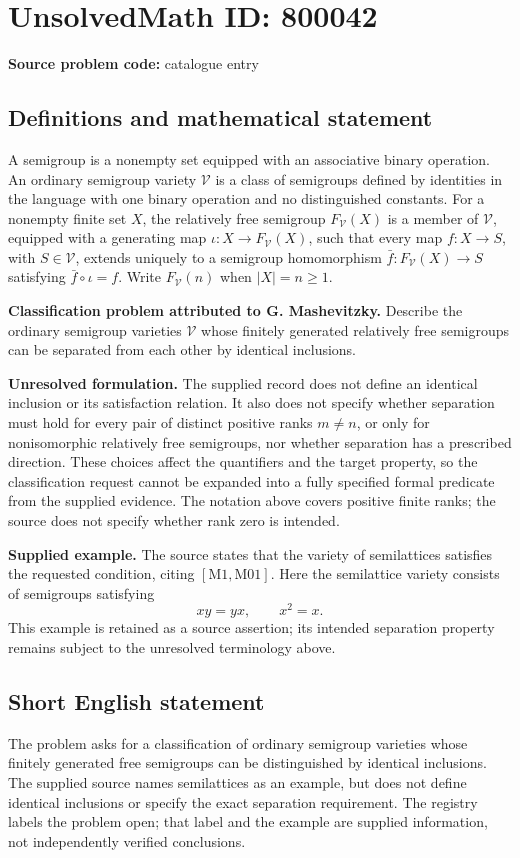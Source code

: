 \documentclass[11pt]{article}
\begin{document}
\section*{UnsolvedMath ID: 800042}
\textbf{Source problem code:} catalogue entry
\subsection{Definitions and mathematical statement}
A semigroup is a nonempty set equipped with an associative binary operation. An ordinary semigroup variety \(\mathcal V\) is a class of semigroups defined by identities in the language with one binary operation and no distinguished constants. For a nonempty finite set \(X\), the relatively free semigroup \(F_{\mathcal V}(X)\) is a member of \(\mathcal V\), equipped with a generating map \(\iota:X\to F_{\mathcal V}(X)\), such that every map \(f:X\to S\), with \(S\in\mathcal V\), extends uniquely to a semigroup homomorphism \(\bar f:F_{\mathcal V}(X)\to S\) satisfying \(\bar f\circ\iota=f\). Write \(F_{\mathcal V}(n)\) when \(|X|=n\geq 1\).

\textbf{Classification problem attributed to G. Mashevitzky.} Describe the ordinary semigroup varieties \(\mathcal V\) whose finitely generated relatively free semigroups can be separated from each other by identical inclusions.

\textbf{Unresolved formulation.} The supplied record does not define an identical inclusion or its satisfaction relation. It also does not specify whether separation must hold for every pair of distinct positive ranks \(m\neq n\), or only for nonisomorphic relatively free semigroups, nor whether separation has a prescribed direction. These choices affect the quantifiers and the target property, so the classification request cannot be expanded into a fully specified formal predicate from the supplied evidence. The notation above covers positive finite ranks; the source does not specify whether rank zero is intended.

\textbf{Supplied example.} The source states that the variety of semilattices satisfies the requested condition, citing \([\mathrm{M1},\mathrm{M01}]\). Here the semilattice variety consists of semigroups satisfying
\[
xy=yx,\qquad x^2=x.
\]
This example is retained as a source assertion; its intended separation property remains subject to the unresolved terminology above.
\subsection{Short English statement}
The problem asks for a classification of ordinary semigroup varieties whose finitely generated free semigroups can be distinguished by identical inclusions. The supplied source names semilattices as an example, but does not define identical inclusions or specify the exact separation requirement. The registry labels the problem open; that label and the example are supplied information, not independently verified conclusions.
\end{document}
